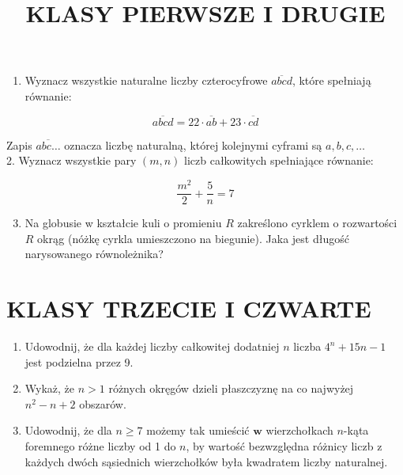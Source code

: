\documentclass[10pt]{article}
\title{KLASY PIERWSZE I DRUGIE }
\author{}
\date{}
\begin{document}
\maketitle
\begin{enumerate}
  \item Wyznacz wszystkie naturalne liczby czterocyfrowe \(\overline{a b c d}\), które spełniają równanie:
\end{enumerate}

\[
\overline{a b c d}=22 \cdot \overline{a b}+23 \cdot \overline{c d}
\]

Zapis \(\overline{a b c \ldots}\) oznacza liczbę naturalną, której kolejnymi cyframi są \(a, b, c, \ldots\)\\
2. Wyznacz wszystkie pary \((m, n)\) liczb całkowitych spełniające równanie:

\[
\frac{m^{2}}{2}+\frac{5}{n}=7
\]

\begin{enumerate}
  \setcounter{enumi}{2}
  \item Na globusie w kształcie kuli o promieniu \(R\) zakreślono cyrklem o rozwartości \(R\) okrąg (nóżkę cyrkla umieszczono na biegunie). Jaka jest długość narysowanego równoleżnika?
\end{enumerate}

\section*{KLASY TRZECIE I CZWARTE}
\begin{enumerate}
  \item Udowodnij, że dla każdej liczby całkowitej dodatniej \(n\) liczba \(4^{n}+15 n-1\) jest podzielna przez 9.
  \item Wykaż, że \(n>1\) różnych okręgów dzieli płaszczyznę na co najwyżej \(n^{2}-n+2\) obszarów.
  \item Udowodnij, że dla \(n \geq 7\) możemy tak umieścić \(\mathbf{w}\) wierzchołkach \(n\)-kąta foremnego różne liczby od 1 do \(n\), by wartość bezwzględna różnicy liczb z każdych dwóch sąsiednich wierzchołków była kwadratem liczby naturalnej.
\end{enumerate}
\end{document}

